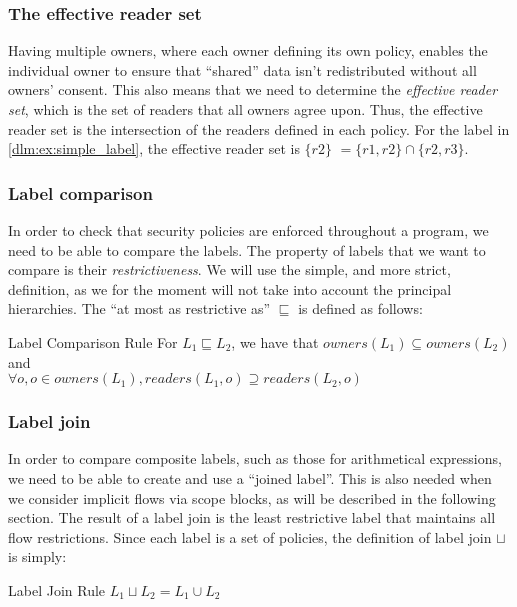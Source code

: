 \subsubsection{The effective reader set}
Having multiple owners, where each owner defining its own policy, enables the individual owner to ensure that ``shared'' data isn't redistributed without all owners' consent.
This also means that we need to determine the \emph{effective reader set}, which is the set of readers that all owners agree upon.
Thus, the effective reader set is the intersection of the readers defined in each policy.
For the label in \cref{dlm:ex:simple_label}, the effective reader set is $\{r2\}$ $= \{r1,r2\} \cap \{r2, r3\}$.

\subsubsection{Label comparison}
In order to check that security policies are enforced throughout a program, we need to be able to compare the labels.
The property of labels that we want to compare is their \emph{restrictiveness}.
We will use the simple, and more strict, definition\cite{myers1997}, as we for the moment will not take into account the principal hierarchies.
The ``at most as restrictive as'' $\sqsubseteq$ is defined as follows:

\begin{definition}{Label Comparison Rule}
  For $L_1 \sqsubseteq L_2$, we have that
  $owners(L_1) \subseteq owners(L_2)$ and\\
  $\forall o, o \in owners(L_1), readers(L_1, o) \supseteq readers(L_2, o)$
\end{definition}

\subsubsection{Label join}
In order to compare composite labels, such as those for arithmetical expressions, we need to be able to create and use a ``joined label''.
This is also needed when we consider implicit flows via scope blocks, as will be described in the following section.
The result of a label join is the least restrictive label that maintains all flow restrictions.
Since each label is a set of policies, the definition of label join $\sqcup$ is simply:

\begin{definition}{Label Join Rule}
  $L_1 \sqcup L_2 = L_1 \cup L_2$
\end{definition}

